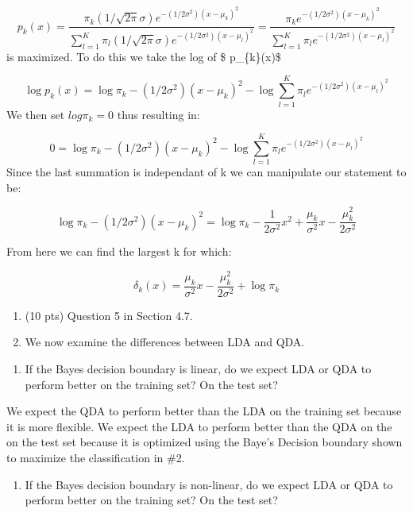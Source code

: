 \documentclass[]{article}
\providecommand{\tightlist}{%
  \setlength{\itemsep}{0pt}\setlength{\parskip}{0pt}}
\begin{document}
\[ p_{k}(x)=\frac{\pi_{k}(1 / \sqrt{2 \pi} \sigma) e^{-\left(1 / 2 \sigma^{2}\right)\left(x-\mu_{k}\right)^{2}}}{\sum_{l=1}^{K} \pi_{l}(1 / \sqrt{2 \pi} \sigma) e^{-\left(1 / 2 \sigma^{2}\right)\left(x-\mu_{l}\right)^{2}}}=\frac{\pi_{k} e^{-\left(1 / 2 \sigma^{2}\right)\left(x-\mu_{k}\right)^{2}}}{\sum_{l=1}^{K} \pi_{l} e^{-\left(1 / 2 \sigma^{2}\right)\left(x-\mu_{l}\right)^{2}}} \]
is maximized. To do this we take the log of \$ p\_\{k\}(x)\$

\[ \log p_{k}(x)=\log \pi_{k}-\left(1 / 2 \sigma^{2}\right)\left(x-\mu_{k}\right)^{2}-\log \sum_{l=1}^{K} \pi_{l} e^{-\left(1 / 2 \sigma^{2}\right)\left(x-\mu_{l}\right)^{2}} \]
We then set \(log{\pi}_k = 0\) thus resulting in:

\[ 0 = \log \pi_{k}-\left(1 / 2 \sigma^{2}\right)\left(x-\mu_{k}\right)^{2}-\log \sum_{l=1}^{K} \pi_{l} e^{-\left(1 / 2 \sigma^{2}\right)\left(x-\mu_{l}\right)^{2}} \]
Since the last summation is independant of k we can manipulate our
statement to be:

\[ \log \pi_{k}-\left(1 / 2 \sigma^{2}\right)\left(x-\mu_{k}\right)^{2}=\log \pi_{k}-\frac{1}{2 \sigma^{2}} x^{2}+\frac{\mu_{k}}{\sigma^{2}} x-\frac{\mu_{k}^{2}}{2 \sigma^{2}} \]

From here we can find the largest k for which:

\[ \delta_{k}(x)=\frac{\mu_{k}}{\sigma^{2}} x-\frac{\mu_{k}^{2}}{2 \sigma^{2}}+\log \pi_{k}\]

\begin{enumerate}
\def\labelenumi{\arabic{enumi}.}
\setcounter{enumi}{3}
\item
  (10 pts) Question 5 in Section 4.7.
\item
  We now examine the differences between LDA and QDA.
\end{enumerate}

\begin{enumerate}
\def\labelenumi{(\alph{enumi})}
\tightlist
\item
  If the Bayes decision boundary is linear, do we expect LDA or QDA to
  perform better on the training set? On the test set?
\end{enumerate}

We expect the QDA to perform better than the LDA on the training set
because it is more flexible. We expect the LDA to perform better than
the QDA on the on the test set because it is optimized using the Baye's
Decision boundary shown to maximize the classification in \#2.

\begin{enumerate}
\def\labelenumi{(\alph{enumi})}
\setcounter{enumi}{1}
\tightlist
\item
  If the Bayes decision boundary is non-linear, do we expect LDA or QDA
  to perform better on the training set? On the test set?
\end{enumerate}
\end{document}
